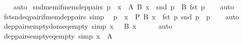 \begin{isabellebody}
%
\isadelimproof
\ \ %
\endisadelimproof
%
\isatagproof
{}\isamarkupfalse%
\ auto%
\endisatagproof
{\isafoldproof}%
%
\isadelimproof
\isanewline
%
\endisadelimproof
\isanewline
{}\isamarkupfalse%
\ snd{\isacharunderscore}{\kern0pt}mem{\isacharunderscore}{\kern0pt}if{\isacharunderscore}{\kern0pt}mem{\isacharunderscore}{\kern0pt}dep{\isacharunderscore}{\kern0pt}pairs{\isacharcolon}{\kern0pt}\ {\isachardoublequoteopen}p\ {\isasymin}\ {\isasymSum}x\ {\isasymin}\ A{\isachardot}{\kern0pt}\ B\ x\ {\isasymLongrightarrow}\ snd\ p\ {\isasymin}\ B\ {\isacharparenleft}{\kern0pt}fst\ p{\isacharparenright}{\kern0pt}{\isachardoublequoteclose}\isanewline
%
\isadelimproof
\ \ %
\endisadelimproof
%
\isatagproof
{}\isamarkupfalse%
\ auto%
\endisatagproof
{\isafoldproof}%
%
\isadelimproof
\isanewline
%
\endisadelimproof
\isanewline
{}\isamarkupfalse%
\ fst{\isacharunderscore}{\kern0pt}snd{\isacharunderscore}{\kern0pt}eq{\isacharunderscore}{\kern0pt}pair{\isacharunderscore}{\kern0pt}if{\isacharunderscore}{\kern0pt}mem{\isacharunderscore}{\kern0pt}dep{\isacharunderscore}{\kern0pt}pairs\ {\isacharbrackleft}{\kern0pt}simp{\isacharbrackright}{\kern0pt}{\isacharcolon}{\kern0pt}\isanewline
\ \ {\isachardoublequoteopen}p\ {\isasymin}\ {\isasymSum}x\ {\isasymin}\ P{\isachardot}{\kern0pt}\ B\ x\ {\isasymLongrightarrow}\ {\isasymlangle}fst\ p{\isacharcomma}{\kern0pt}\ snd\ p{\isasymrangle}\ {\isacharequal}{\kern0pt}\ p{\isachardoublequoteclose}\isanewline
%
\isadelimproof
\ \ %
\endisadelimproof
%
\isatagproof
{}\isamarkupfalse%
\ auto%
\endisatagproof
{\isafoldproof}%
%
\isadelimproof
\isanewline
%
\endisadelimproof
\isanewline
{}\isamarkupfalse%
\ dep{\isacharunderscore}{\kern0pt}pairs{\isacharunderscore}{\kern0pt}empty{\isacharunderscore}{\kern0pt}dom{\isacharunderscore}{\kern0pt}eq{\isacharunderscore}{\kern0pt}empty\ {\isacharbrackleft}{\kern0pt}simp{\isacharbrackright}{\kern0pt}{\isacharcolon}{\kern0pt}\ {\isachardoublequoteopen}{\isasymSum}x\ {\isasymin}\ {\isacharbraceleft}{\kern0pt}{\isacharbraceright}{\kern0pt}{\isachardot}{\kern0pt}\ B\ x\ {\isacharequal}{\kern0pt}\ {\isacharbraceleft}{\kern0pt}{\isacharbraceright}{\kern0pt}{\isachardoublequoteclose}\isanewline
%
\isadelimproof
\ \ %
\endisadelimproof
%
\isatagproof
{}\isamarkupfalse%
\ auto%
\endisatagproof
{\isafoldproof}%
%
\isadelimproof
\isanewline
%
\endisadelimproof
\isanewline
{}\isamarkupfalse%
\ dep{\isacharunderscore}{\kern0pt}pairs{\isacharunderscore}{\kern0pt}empty{\isacharunderscore}{\kern0pt}eq{\isacharunderscore}{\kern0pt}empty\ {\isacharbrackleft}{\kern0pt}simp{\isacharbrackright}{\kern0pt}{\isacharcolon}{\kern0pt}\ {\isachardoublequoteopen}{\isasymSum}x\ {\isasymin}\ A{\isachardot}{\kern0pt}\ {\isacharbraceleft}{\kern0pt}{\isacharbraceright}{\kern0pt}\ {\isacharequal}{\kern0pt}\ {\isacharbraceleft}{\kern0pt}{\isacharbraceright}{\kern0pt}{\isachardoublequoteclose}\isanewline

\end{isabellebody}
